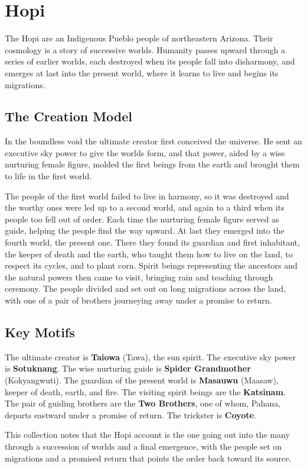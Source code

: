 \section{Hopi}

The Hopi are an Indigenous Pueblo people of northeastern Arizona. Their cosmology is a story of successive worlds. Humanity passes upward through a series of earlier worlds, each destroyed when its people fall into disharmony, and emerges at last into the present world, where it learns to live and begins its migrations.

\subsection{The Creation Model}

In the boundless void the ultimate creator first conceived the universe. He sent an executive sky power to give the worlds form, and that power, aided by a wise nurturing female figure, molded the first beings from the earth and brought them to life in the first world.

The people of the first world failed to live in harmony, so it was destroyed and the worthy ones were led up to a second world, and again to a third when its people too fell out of order. Each time the nurturing female figure served as guide, helping the people find the way upward. At last they emerged into the fourth world, the present one. There they found its guardian and first inhabitant, the keeper of death and the earth, who taught them how to live on the land, to respect its cycles, and to plant corn. Spirit beings representing the ancestors and the natural powers then came to visit, bringing rain and teaching through ceremony. The people divided and set out on long migrations across the land, with one of a pair of brothers journeying away under a promise to return.

\subsection{Key Motifs}

The ultimate creator is \textbf{Taiowa} (Tawa), the sun spirit. The executive sky power is \textbf{Sotuknang}. The wise nurturing guide is \textbf{Spider Grandmother} (Kokyangwuti). The guardian of the present world is \textbf{Masauwu} (Maasaw), keeper of death, earth, and fire. The visiting spirit beings are the \textbf{Katsinam}. The pair of guiding brothers are the \textbf{Two Brothers}, one of whom, Pahana, departs eastward under a promise of return. The trickster is \textbf{Coyote}.

This collection notes that the Hopi account is the one going out into the many through a succession of worlds and a final emergence, with the people set on migrations and a promised return that points the order back toward its source.
